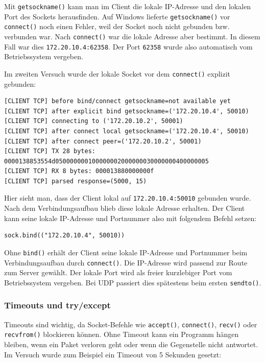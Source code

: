 \documentclass{kdiartcl}
\begin{document}
Mit \texttt{getsockname()} kann man im Client die lokale IP-Adresse und den lokalen Port des Sockets herausfinden. Auf Windows lieferte \texttt{getsockname()} vor \texttt{connect()} noch einen Fehler, weil der Socket noch nicht gebunden bzw. verbunden war. Nach \texttt{connect()} war die lokale Adresse aber bestimmt. In diesem Fall war dies \texttt{172.20.10.4:62358}. Der Port \texttt{62358} wurde also automatisch vom Betriebssystem vergeben.

Im zweiten Versuch wurde der lokale Socket vor dem \texttt{connect()} explizit gebunden:

\begin{verbatim}
[CLIENT TCP] before bind/connect getsockname=not available yet
[CLIENT TCP] after explicit bind getsockname=('172.20.10.4', 50010)
[CLIENT TCP] connecting to ('172.20.10.2', 50001)
[CLIENT TCP] after connect local getsockname=('172.20.10.4', 50010)
[CLIENT TCP] after connect peer=('172.20.10.2', 50001)
[CLIENT TCP] TX 28 bytes: 0000138853554d050000000100000002000000030000000400000005
[CLIENT TCP] RX 8 bytes: 000013880000000f
[CLIENT TCP] parsed response=(5000, 15)
\end{verbatim}

Hier sieht man, dass der Client lokal auf \texttt{172.20.10.4:50010} gebunden wurde. Nach dem Verbindungsaufbau blieb diese lokale Adresse erhalten. Der Client kann seine lokale IP-Adresse und Portnummer also mit folgendem Befehl setzen:

\begin{verbatim}
sock.bind(("172.20.10.4", 50010))
\end{verbatim}

Ohne \texttt{bind()} erhält der Client seine lokale IP-Adresse und Portnummer beim Verbindungsaufbau durch \texttt{connect()}. Die IP-Adresse wird passend zur Route zum Server gewählt. Der lokale Port wird als freier kurzlebiger Port vom Betriebssystem vergeben. Bei UDP passiert dies spätestens beim ersten \texttt{sendto()}.

\subsubsection{Timeouts und try/except}

Timeouts sind wichtig, da Socket-Befehle wie \texttt{accept()}, \texttt{connect()}, \texttt{recv()} oder \texttt{recvfrom()} blockieren können. Ohne Timeout kann ein Programm hängen bleiben, wenn ein Paket verloren geht oder wenn die Gegenstelle nicht antwortet. Im Versuch wurde zum Beispiel ein Timeout von 5 Sekunden gesetzt:
\end{document}
